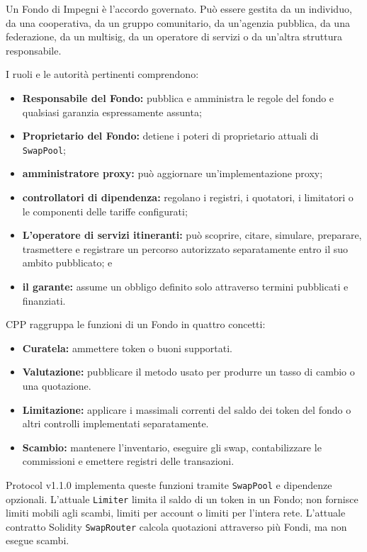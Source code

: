 \documentclass[11pt]{article}
\begin{document}
Un Fondo di Impegni è l'accordo governato. Può essere gestita da un individuo, da una cooperativa, da un gruppo comunitario, da un'agenzia pubblica, da una federazione, da un multisig, da un operatore di servizi o da un'altra struttura responsabile.

I ruoli e le autorità pertinenti comprendono:

\begin{itemize}[leftmargin=*]
\item \textbf{Responsabile del Fondo:} pubblica e amministra le regole del fondo e qualsiasi garanzia espressamente assunta;
\item \textbf{Proprietario del Fondo:} detiene i poteri di proprietario attuali di \texttt{SwapPool};
\item \textbf{amministratore proxy:} può aggiornare un'implementazione proxy;
\item \textbf{controllatori di dipendenza:} regolano i registri, i quotatori, i limitatori o le componenti delle tariffe configurati;
\item \textbf{L'operatore di servizi itineranti:} può scoprire, citare, simulare, preparare, trasmettere e registrare un percorso autorizzato separatamente entro il suo ambito pubblicato; e
\item \textbf{il garante:} assume un obbligo definito solo attraverso termini pubblicati e finanziati.
\end{itemize}
CPP raggruppa le funzioni di un Fondo in quattro concetti:

\begin{itemize}[leftmargin=*]
\item \textbf{Curatela:} ammettere token o buoni supportati.
\item \textbf{Valutazione:} pubblicare il metodo usato per produrre un tasso di cambio o una quotazione.
\item \textbf{Limitazione:} applicare i massimali correnti del saldo dei token del fondo o altri controlli implementati separatamente.
\item \textbf{Scambio:} mantenere l'inventario, eseguire gli swap, contabilizzare le commissioni e emettere registri delle transazioni.
\end{itemize}
Protocol v1.1.0 implementa queste funzioni tramite \texttt{SwapPool} e dipendenze opzionali. L'attuale \texttt{Limiter} limita il saldo di un token in un Fondo; non fornisce limiti mobili agli scambi, limiti per account o limiti per l'intera rete. L'attuale contratto Solidity \texttt{SwapRouter} calcola quotazioni attraverso più Fondi, ma non esegue scambi.
\end{document}
